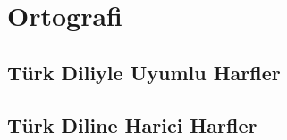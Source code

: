 \chapter{Ortografi}

\section{Türk Diliyle Uyumlu Harfler}

\section{Türk Diline Harici Harfler}





